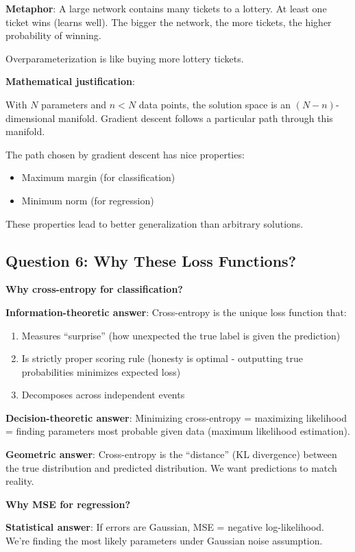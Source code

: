\textbf{Metaphor}: A large network contains many tickets to a lottery. At least one ticket wins (learns well). The bigger the network, the more tickets, the higher probability of winning.

Overparameterization is like buying more lottery tickets.

\textbf{Mathematical justification}:

With $N$ parameters and $n < N$ data points, the solution space is an $(N-n)$-dimensional manifold. Gradient descent follows a particular path through this manifold.

The path chosen by gradient descent has nice properties:
\begin{itemize}
\item Maximum margin (for classification)
\item Minimum norm (for regression)
\end{itemize}

These properties lead to better generalization than arbitrary solutions.

\subsection{Question 6: Why These Loss Functions?}

\textbf{Why cross-entropy for classification?}

\textbf{Information-theoretic answer}: Cross-entropy is the unique loss function that:
\begin{enumerate}
\item Measures ``surprise'' (how unexpected the true label is given the prediction)
\item Is strictly proper scoring rule (honesty is optimal - outputting true probabilities minimizes expected loss)
\item Decomposes across independent events
\end{enumerate}

\textbf{Decision-theoretic answer}: Minimizing cross-entropy = maximizing likelihood = finding parameters most probable given data (maximum likelihood estimation).

\textbf{Geometric answer}: Cross-entropy is the ``distance'' (KL divergence) between the true distribution and predicted distribution. We want predictions to match reality.

\textbf{Why MSE for regression?}

\textbf{Statistical answer}: If errors are Gaussian, MSE = negative log-likelihood. We're finding the most likely parameters under Gaussian noise assumption.

